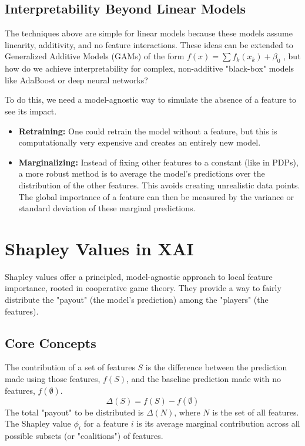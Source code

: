 \documentclass{article}
\begin{document}
\begin{multicols}{2}
\subsection{Interpretability Beyond Linear Models}
The techniques above are simple for linear models because these models assume linearity, additivity, and no feature interactions. These ideas can be extended to Generalized Additive Models (GAMs) of the form $f(x) = \sum f_k(x_k) + \beta_0$ , but how do we achieve interpretability for complex, non-additive "black-box" models like AdaBoost or deep neural networks? 

To do this, we need a model-agnostic way to simulate the absence of a feature to see its impact.
\begin{itemize}
    \item \textbf{Retraining:} One could retrain the model without a feature, but this is computationally very expensive and creates an entirely new model.
    \item \textbf{Marginalizing:} Instead of fixing other features to a constant (like in PDPs), a more robust method is to average the model's predictions over the distribution of the other features. This avoids creating unrealistic data points. The global importance of a feature can then be measured by the variance or standard deviation of these marginal predictions.
\end{itemize}

\section{Shapley Values in XAI}
Shapley values offer a principled, model-agnostic approach to local feature importance, rooted in cooperative game theory. They provide a way to fairly distribute the "payout" (the model's prediction) among the "players" (the features).

\subsection{Core Concepts}
The contribution of a set of features $S$ is the difference between the prediction made using those features, $f(S)$, and the baseline prediction made with no features, $f(\emptyset)$.
$$ \Delta(S) = f(S) - f(\emptyset) $$
The total "payout" to be distributed is $\Delta(N)$, where $N$ is the set of all features. The Shapley value $\phi_i$ for a feature $i$ is its average marginal contribution across all possible subsets (or "coalitions") of features.


\end{multicols}
\end{document}
